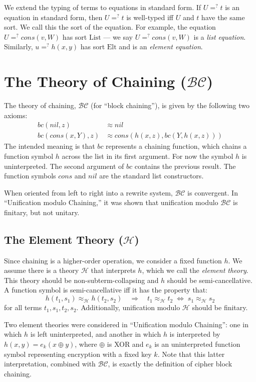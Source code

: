 \documentclass[11pt,twoside,titlepage]{article}
\newcommand{\ueq}{=_{}^?}
\newcommand{\BC}{\mathcal{BC}}
\newcommand{\HH}{\mathcal{H}}
\newcommand{\Elt}{\mathrm{Elt}}
\newcommand{\List}{\mathrm{List}}
\newcommand{\Bc}{\mathit{bc}}
\newcommand{\Hh}{\mathit{h}}
\newcommand{\Cons}{\mathit{cons}}
\newcommand{\Nil}{\mathit{nil}}
\begin{document}
We extend the typing of terms to equations in standard form. If $U \ueq t$ is
an equation in standard form, then $U \ueq t$ is well-typed iff $U$ and $t$
have the same sort. We call this the sort of the equation. For example, the
equation $U \ueq \Cons(v, W)$ has sort $\List$ --- we say $U \ueq \Cons(v, W)$
is a \emph{list equation}. Similarly, $u \ueq h(x, y)$ has sort $\Elt$ and is
an \emph{element equation}.

\section{The Theory of Chaining (\texorpdfstring{$\BC$}{BC})}
\label{section:theory}

The theory of chaining, $\BC$ (for ``block chaining''), is given by the
following two axioms:
\begin{align*}
    \Bc(\Nil, z) &\approx \Nil \\
    \Bc(\Cons(x, Y), z) &\approx \Cons(\Hh(x, z), \Bc(Y, \Hh(x, z)))
\end{align*}
The intended meaning is that $\Bc$ represents a chaining function, which chains
a function symbol $\Hh$ across the list in its first argument. For now the
symbol $\Hh$ is uninterpreted. The second argument of $\Bc$ contains the
previous result. The function symbols $\Cons$ and $\Nil$ are the standard list
constructors.

When oriented from left to right into a rewrite system, $\BC$ is convergent.
In ``Unification modulo Chaining,'' it was shown that unification modulo $\BC$
is finitary, but not unitary.

\subsection{The Element Theory (\texorpdfstring{$\HH$}{H})}
\label{subsection:element-theory}

Since chaining is a higher-order operation, we consider a fixed function $\Hh$.
We assume there is a theory $\HH$ that interprets $\Hh$, which we call the
\emph{element theory}. This theory should be non-subterm-collapsing and
$\Hh$ should be semi-cancellative. A function symbol is semi-cancellative iff
it has the property that:
\[ \Hh(t_1, s_1) \approx_\HH^{} \Hh(t_2, s_2) \quad \Rightarrow \quad
t_1 \approx_\HH^{} t_2 \; \Leftrightarrow \; s_1 \approx_\HH^{} s_2 \]
for all terms $t_1, s_1, t_2, s_2$. Additionally, unification modulo $\HH$
should be finitary.

Two element theories were considered in ``Unification modulo Chaining'': one in
which $\Hh$ is left uninterpreted, and another in which $\Hh$ is interpreted by
$\Hh(x, y) = e_k(x \oplus y)$, where $\oplus$ is XOR and $e_k$ is an
uninterpreted function symbol representing encryption with a fixed key $k$.
Note that this latter interpretation, combined with $\BC$, is exactly the
definition of cipher block chaining.
\end{document}
